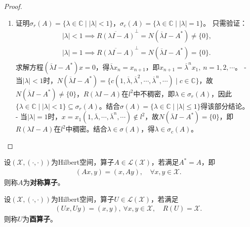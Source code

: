 \documentclass[../../main.tex]{subfiles}%
\begin{document}
\begin{proof}
\begin{enumerate}[(1)]
\item 证明$\sigma_r(A)=\{\lambda\in\mathbb{C}\mid|\lambda|<1\}$，$\sigma_c(A)=\{\lambda\in\mathbb{C}\mid|\lambda|=1\}$。
只需验证：
\begin{align*}
&|\lambda|<1\implies \overline{R(\lambda I-A)}^{\perp}=N(\overline{\lambda}I-A^*)\neq\{0\},\\
&|\lambda|=1\implies \overline{R(\lambda I-A)}^{\perp}=N(\overline{\lambda}I-A^*)=\{0\}.
\end{align*}
求解方程$(\overline{\lambda}I-A^*)x=0$，得$\overline{\lambda}x_n=x_{n+1}$，即$x_{n+1}=\overline{\lambda}^n x_1,\ n=1,2,\cdots$。
- 当$|\lambda|<1$时，$N(\overline{\lambda}I-A^*)=\{c(1,\overline{\lambda},\overline{\lambda}^2,\cdots,\overline{\lambda}^n,\cdots)\mid c\in\mathbb{C}\}$，故$N(\overline{\lambda}I-A^*)\neq\{0\}$，$R(\lambda I-A)$在$l^2$中不稠密，即$\lambda\in\sigma_r(A)$，因此$\{\lambda\in\mathbb{C}\mid|\lambda|<1\}\subseteq\sigma_r(A)$。结合$\sigma(A)=\{\lambda\in\mathbb{C}\mid|\lambda|\leqslant1\}$得该部分结论。
- 当$|\lambda|=1$时，$x=x_1(1,\overline{\lambda},\cdots,\overline{\lambda}^n,\cdots)\notin l^2$，故$N(\overline{\lambda}I-A^*)=\{0\}$，即$R(\lambda I-A)$在$l^2$中稠密。结合$\lambda\in\sigma(A)$，得$\lambda\in\sigma_c(A)$。
\end{enumerate}
\end{proof}

\begin{definition}
设$(\mathscr{X},(\cdot,\cdot))$为Hilbert空间，算子$A\in\mathscr{L}(\mathscr{X})$，若满足$A^*=A$，即
\begin{align}
(Ax,y)=(x,Ay),\quad \forall x,y\in\mathscr{X}.
\label{eq:sym-op}
\end{align}
则称$A$为\textbf{对称算子}。
\end{definition}

\begin{definition}
设$(\mathscr{X},(\cdot,\cdot))$为Hilbert空间，算子$U\in\mathscr{L}(\mathscr{X})$，若满足
\begin{align}
(Ux,Uy)=(x,y),\ \forall x,y\in\mathscr{X},\quad R(U)=\mathscr{X}.
\label{eq:unitary-op}
\end{align}
则称$U$为\textbf{酉算子}。
\end{definition}
\end{document}
